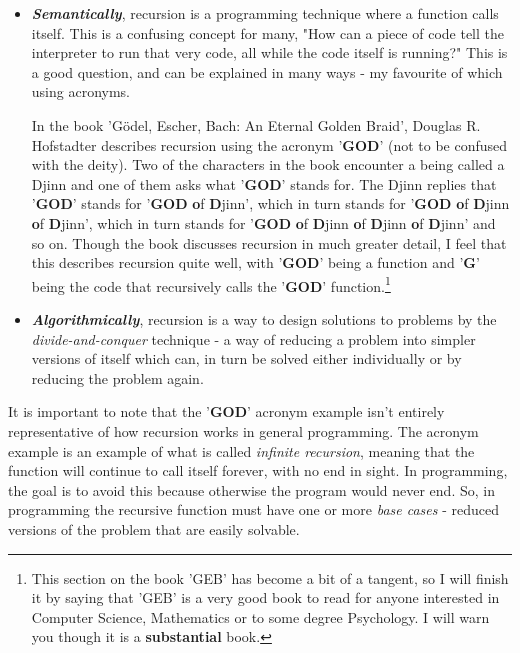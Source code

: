 \documentclass{article}
\begin{document}
\begin{itemize}
    \item \textbf{\textit{Semantically}}, recursion is a programming technique where a function calls itself. This is a confusing concept for many, "How can a piece of code tell the interpreter to run that very code, all while the code itself is running?" This is a good question, and can be explained in many ways - my favourite of which using acronyms.\medskip

    In the book 'G{\"o}del, Escher, Bach: An Eternal Golden Braid', Douglas R. Hofstadter describes recursion using the acronym '\textbf{GOD}' (not to be confused with the deity). Two of the characters in the book encounter a being called a Djinn and one of them asks what '\textbf{GOD}' stands for. The Djinn replies that '\textbf{GOD}' stands for '\textbf{GOD} \textbf{o}f \textbf{D}jinn', which in turn stands for '\textbf{GOD} \textbf{o}f \textbf{D}jinn \textbf{o}f \textbf{D}jinn', which in turn stands for '\textbf{GOD} \textbf{o}f \textbf{D}jinn \textbf{o}f \textbf{D}jinn \textbf{o}f \textbf{D}jinn' and so on. Though the book discusses recursion in much greater detail, I feel that this describes recursion quite well, with '\textbf{GOD}' being a function and '\textbf{G}' being the code that recursively calls the '\textbf{GOD}' function.\footnote{This section on the book 'GEB' has become a bit of a tangent, so I will finish it by saying that 'GEB' is a very good book to read for anyone interested in Computer Science, Mathematics or to some degree Psychology. I will warn you though it is a \textbf{substantial} book.}

    \item \textbf{\textit{Algorithmically}}, recursion is a way to design solutions to problems by the \textit{divide-and-conquer} technique - a way of reducing a problem into simpler versions of itself which can, in turn be solved either individually or by reducing the problem again.
\end{itemize}
It is important to note that the '\textbf{GOD}' acronym example isn't entirely representative of how recursion works in general programming. The acronym example is an example of what is called \textit{infinite recursion}, meaning that the function will continue to call itself forever, with no end in sight. In programming, the goal is to avoid this because otherwise the program would never end. So, in programming the recursive function must have one or more \textit{base cases} - reduced versions of the problem that are easily solvable.
\end{document}
